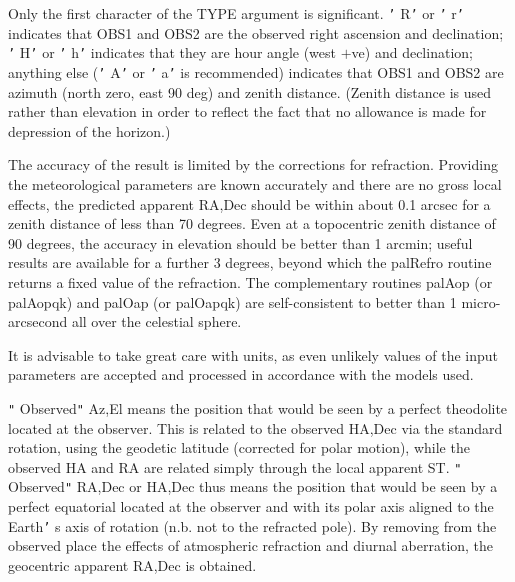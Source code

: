 \documentclass[twoside,11pt,nolof]{starlink}
\begin{document}
{{{         \sstitem
          Only the first character of the TYPE argument is significant.
         \texttt{'} R\texttt{'}  or \texttt{'} r\texttt{'}  indicates that OBS1 and OBS2 are the observed right
         ascension and declination;  \texttt{'} H\texttt{'}  or \texttt{'} h\texttt{'}  indicates that they are
         hour angle (west $+$ve) and declination;  anything else (\texttt{'} A\texttt{'}  or
         \texttt{'} a\texttt{'}  is recommended) indicates that OBS1 and OBS2 are azimuth
         (north zero, east 90 deg) and zenith distance.  (Zenith
         distance is used rather than elevation in order to reflect the
         fact that no allowance is made for depression of the horizon.)

         \sstitem
          The accuracy of the result is limited by the corrections for
         refraction.  Providing the meteorological parameters are
         known accurately and there are no gross local effects, the
         predicted apparent RA,Dec should be within about 0.1 arcsec
         for a zenith distance of less than 70 degrees.  Even at a
         topocentric zenith distance of 90 degrees, the accuracy in
         elevation should be better than 1 arcmin;  useful results
         are available for a further 3 degrees, beyond which the
         palRefro routine returns a fixed value of the refraction.
         The complementary routines palAop (or palAopqk) and palOap
         (or palOapqk) are self-consistent to better than 1 micro-
         arcsecond all over the celestial sphere.

         \sstitem
          It is advisable to take great care with units, as even
         unlikely values of the input parameters are accepted and
         processed in accordance with the models used.

         \sstitem
          \texttt{"} Observed\texttt{"}  Az,El means the position that would be seen by a
         perfect theodolite located at the observer.  This is
         related to the observed HA,Dec via the standard rotation, using
         the geodetic latitude (corrected for polar motion), while the
         observed HA and RA are related simply through the local
         apparent ST.  \texttt{"} Observed\texttt{"}  RA,Dec or HA,Dec thus means the
         position that would be seen by a perfect equatorial located
         at the observer and with its polar axis aligned to the
         Earth\texttt{'} s axis of rotation (n.b. not to the refracted pole).
         By removing from the observed place the effects of
         atmospheric refraction and diurnal aberration, the
         geocentric apparent RA,Dec is obtained.

}}}
\end{document}
